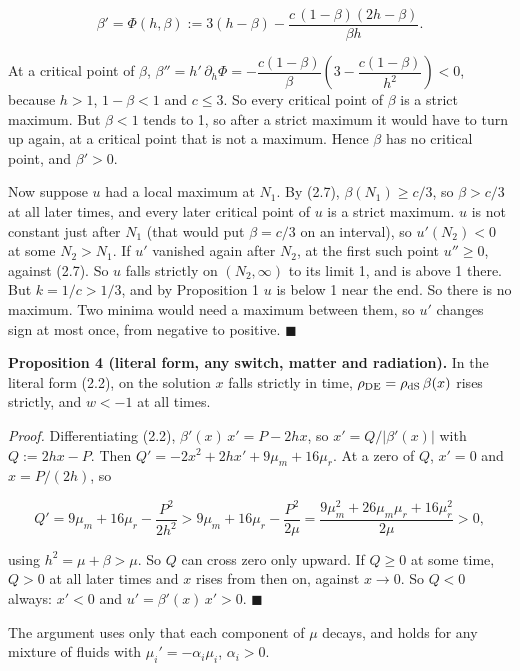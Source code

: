 \documentclass[11pt,a4paper]{article}
\begin{document}
\begin{equation*}
\beta' = \Phi(h, \beta) := 3(h - \beta) - \frac{c\,(1 - \beta)(2h - \beta)}{\beta h}.
\end{equation*}


At a critical point of $\beta$, $\beta'' = h'\,\partial_h\Phi = -\dfrac{c(1 - \beta)}{\beta}\left(3 - \dfrac{c(1 - \beta)}{h^2}\right) < 0$,
because $h > 1$, $1 - \beta < 1$ and $c \le 3$. So every critical point of $\beta$ is a strict maximum. But $\beta < 1$ tends
to 1, so after a strict maximum it would have to turn up again, at a critical point that is not a maximum. Hence
$\beta$ has no critical point, and $\beta' > 0$.

Now suppose $u$ had a local maximum at $N_1$. By (2.7), $\beta(N_1) \ge c/3$, so $\beta > c/3$ at all later times, and
every later critical point of $u$ is a strict maximum. $u$ is not constant just after $N_1$ (that would put
$\beta = c/3$ on an interval), so $u'(N_2) < 0$ at some $N_2 > N_1$. If $u'$ vanished again after $N_2$, at the first
such point $u'' \ge 0$, against (2.7). So $u$ falls strictly on $(N_2, \infty)$ to its limit 1, and is above 1 there.
But $k = 1/c > 1/3$, and by Proposition 1 $u$ is below 1 near the end. So there is no maximum. Two minima would
need a maximum between them, so $u'$ changes sign at most once, from negative to positive. \hfill$\blacksquare$

{\bfseries\boldmath Proposition 4 (literal form, any switch, matter and radiation).} In the literal form (2.2), on the solution $x$
falls strictly in time, $\rho_{\rm DE} = \rho_{\rm dS}\,\beta(x)$ rises strictly, and $w < -1$ at all times.

\emph{Proof.} Differentiating (2.2), $\beta'(x)\,x' = P - 2hx$, so $x' = Q/|\beta'(x)|$ with $Q := 2hx - P$. Then
$Q' = -2x^2 + 2hx' + 9\mu_m + 16\mu_r$. At a zero of $Q$, $x' = 0$ and $x = P/(2h)$, so


\begin{equation*}
Q' = 9\mu_m + 16\mu_r - \frac{P^2}{2h^2} > 9\mu_m + 16\mu_r - \frac{P^2}{2\mu} = \frac{9\mu_m^2 + 26\mu_m\mu_r + 16\mu_r^2}{2\mu} > 0,
\end{equation*}


using $h^2 = \mu + \beta > \mu$. So $Q$ can cross zero only upward. If $Q \ge 0$ at some time, $Q > 0$ at all later times
and $x$ rises from then on, against $x \to 0$. So $Q < 0$ always: $x' < 0$ and $u' = \beta'(x)\,x' > 0$. \hfill$\blacksquare$

The argument uses only that each component of $\mu$ decays, and holds for any mixture of fluids with
$\mu_i' = -\alpha_i\mu_i$, $\alpha_i > 0$.
\end{document}
